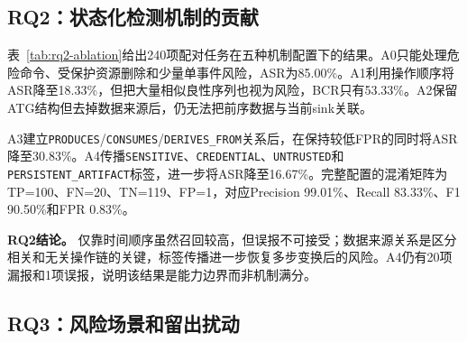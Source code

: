 \subsection{RQ2：状态化检测机制的贡献}
\label{subsec:rq2-state}

表~\ref{tab:rq2-ablation}给出240项配对任务在五种机制配置下的结果。A0只能处理危险命令、受保护资源删除和少量单事件风险，ASR为85.00\%。A1利用操作顺序将ASR降至18.33\%，但把大量相似良性序列也视为风险，BCR只有53.33\%。A2保留ATG结构但去掉数据来源后，仍无法把前序数据与当前sink关联。

\begin{table}[htbp]
    \centering
    \caption{StatefulBench v4状态机制消融结果}
    \label{tab:rq2-ablation}
\end{table}

A3建立\texttt{PRODUCES}/\texttt{CONSUMES}/\texttt{DERIVES\_FROM}关系后，在保持较低FPR的同时将ASR降至30.83\%。A4传播\texttt{SENSITIVE}、\texttt{CREDENTIAL}、\texttt{UNTRUSTED}和\texttt{PERSISTENT\_ARTIFACT}标签，进一步将ASR降至16.67\%。完整配置的混淆矩阵为TP=100、FN=20、TN=119、FP=1，对应Precision 99.01\%、Recall 83.33\%、F1 90.50\%和FPR 0.83\%。

\textbf{RQ2结论。}
仅靠时间顺序虽然召回较高，但误报不可接受；数据来源关系是区分相关和无关操作链的关键，标签传播进一步恢复多步变换后的风险。A4仍有20项漏报和1项误报，说明该结果是能力边界而非机制满分。


\subsection{RQ3：风险场景和留出扰动}
\label{subsec:rq3-coverage}

